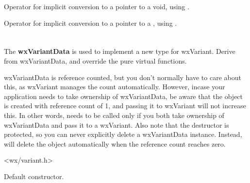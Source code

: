 
Operator for implicit conversion to a pointer to a void, using .

\label{wxvariantdatetime}


Operator for implicit conversion to a pointer to a , using .

\section{}\label{wxvariantdata}

The {\bf wxVariantData} is used to implement a new type for wxVariant. Derive from wxVariantData,
and override the pure virtual functions.

wxVariantData is reference counted, but you don't normally have to care about this, as
wxVariant manages the count automatically. However, incase your application needs to take
ownership of wxVariantData, be aware that the object is created with reference count of 1,
and passing it to wxVariant will not increase this. In other words, 
needs to be called only if you both take ownership of wxVariantData and pass it to a wxVariant.
Also note that the destructor is protected, so you can never explicitly delete a wxVariantData
instance. Instead,  will delete the object automatically
when the reference count reaches zero.




<wx/variant.h>




\label{wxvariantdatactor}


Default constructor.

\label{wxvariantdatadecref}

